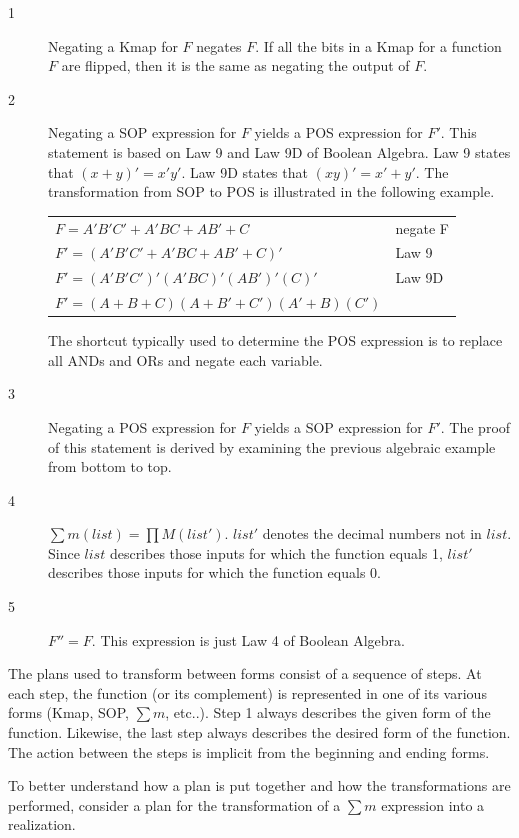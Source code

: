 \begin{process:minimizationKmap}
\begin{description}
\item [1] Negating a Kmap for $F$ negates $F$.  If all the 
bits in a Kmap for a function $F$ are flipped, then it is
the same as negating the output of $F$.

\item [2] Negating a SOP expression for $F$ yields a POS 
\label{page:second} expression for $F'$.  This statement is 
based on Law 9 and Law 9D of Boolean Algebra.  Law 9 states that 
$(x+y)' = x'y'$.  Law 9D states that $(xy)' = x'+y'$.
The transformation from SOP to POS is illustrated
in the following example.

\begin{tabular}[ht]{ll}
$F  = A'B'C' + A'BC + AB' + C$      & negate F \\
$F' = (A'B'C' + A'BC + AB' + C)'$   & Law 9 \\
$F' = (A'B'C')'(A'BC)'(AB')'(C)'$   & Law 9D \\
$F' = (A+B+C)(A+B'+C')(A'+B)(C')$  \\
\end{tabular}

The shortcut typically used to determine the POS expression
is to replace all ANDs and ORs and negate each variable. 

\item [3] Negating a POS expression for $F$ yields a SOP 
expression for $F'$.  The proof of this statement is
derived by examining the previous algebraic example from
bottom to top.

\item [4] $\sum m(list) = \prod M(list')$.  $list'$ 
denotes the decimal numbers not in $list$.  Since $list$ 
describes those inputs for which the function equals 1, 
$list'$ describes those inputs for which the function 
equals 0. 

\item [5] $F'' = F$.  This expression is just Law 4 of Boolean Algebra.
\end{description}

The plans used to transform between forms consist 
of a sequence of steps.  At each step, the function 
(or its complement) is represented in one
of its various forms (Kmap, SOP, $\sum m$, etc..). 
Step 1 always describes the given form of the function.  
Likewise, the last step always describes the desired form
of the function.  The action between the steps is implicit
from the beginning and ending forms.  

To better understand how a plan is put together and how the
transformations are performed, consider a plan for the
transformation of a $\sum m$ expression into a \SOPmin realization.


\end{process:minimizationKmap}
